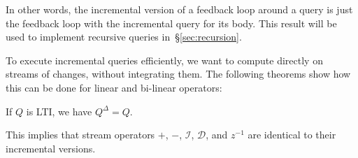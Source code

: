 \documentclass[twocolumn
]{svjour3}
\numberwithin{equation}{section}
\newcommand{\zm}{\ensuremath{z^{-1}}} %
\newcommand{\I}{\mathcal{I}}  %
\newcommand{\D}{\mathcal{D}}  %
\newcommand{\I}{\mathit{I}}  %
\newcommand{\D}{\mathit{D}}  %
\newcommand{\inc}[1]{{#1}^{\Delta}}
\newcommand{\secref}[1]{\S\ref{#1}}  %
\newcommand{\refsec}[1]{\secref{#1}}
\begin{document}
In other words, the incremental version of a feedback loop around a
query is just the feedback loop with the incremental query for its
body.  This result will be used to implement recursive queries
in~\refsec{sec:recursion}.

To execute incremental queries efficiently, we want to compute
directly on streams of changes, without integrating them.  The
following theorems show how this can be done for linear and bi-linear
operators:

\begin{theorem}[Linear]\label{linear}
If $Q$ is LTI, we have $\inc{Q}=Q$.
\end{theorem}

This implies that stream operators $+$, $-$, $\I$, $\D$, and $\zm$ are
identical to their incremental versions.
\end{document}
